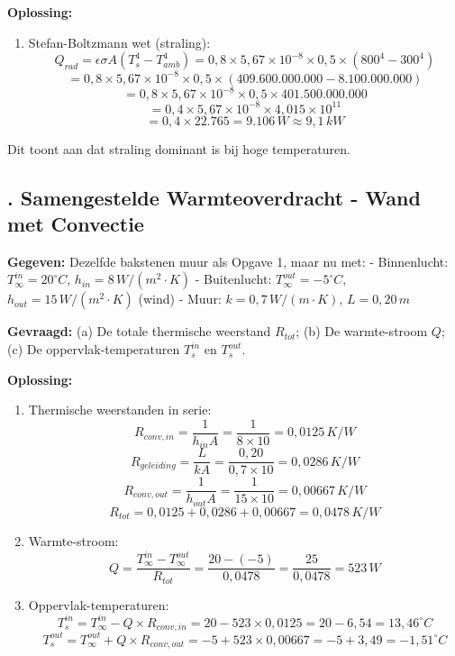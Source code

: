 \documentclass[a4paper,11pt,twoside]{report}
\newcounter{opgave}[section]
\newcommand{\opgave}[1]{%
    \refstepcounter{opgave}%
    \subsection*{\textbf{\arabic{opgave}.} #1}%
}
\begin{document}
\textbf{Oplossing:}
\begin{enumerate}
    \item Stefan-Boltzmann wet (straling):
    \[ Q_{rad} = \epsilon \sigma A (T_s^4 - T_{amb}^4) = 0,8 \times 5,67 \times 10^{-8} \times 0,5 \times (800^4 - 300^4) \]
    \[ = 0,8 \times 5,67 \times 10^{-8} \times 0,5 \times (409.600.000.000 - 8.100.000.000) \]
    \[ = 0,8 \times 5,67 \times 10^{-8} \times 0,5 \times 401.500.000.000 \]
    \[ = 0,4 \times 5,67 \times 10^{-8} \times 4,015 \times 10^{11} \]
    \[ = 0,4 \times 22.765 = 9.106 \, W \approx 9,1 \, kW \]
\end{enumerate}

Dit toont aan dat straling dominant is bij hoge temperaturen.

\opgave{Samengestelde Warmteoverdracht - Wand met Convectie}
\textbf{Gegeven:}
Dezelfde bakstenen muur als Opgave 1, maar nu met:
- Binnenlucht: $T_\infty^{in} = 20^\circ C$, $h_{in} = 8 \, W/(m^2 \cdot K)$
- Buitenlucht: $T_\infty^{out} = -5^\circ C$, $h_{out} = 15 \, W/(m^2 \cdot K)$ (wind)
- Muur: $k = 0,7 \, W/(m \cdot K)$, $L = 0,20 \, m$

\textbf{Gevraagd:}
(a) De totale thermische weerstand $R_{tot}$; (b) De warmte-stroom $Q$; (c) De oppervlak-temperaturen $T_s^{in}$ en $T_s^{out}$.

\textbf{Oplossing:}
\begin{enumerate}
    \item Thermische weerstanden in serie:
    \[ R_{conv,in} = \frac{1}{h_{in} A} = \frac{1}{8 \times 10} = 0,0125 \, K/W \]
    \[ R_{geleiding} = \frac{L}{k A} = \frac{0,20}{0,7 \times 10} = 0,0286 \, K/W \]
    \[ R_{conv,out} = \frac{1}{h_{out} A} = \frac{1}{15 \times 10} = 0,00667 \, K/W \]
    \[ R_{tot} = 0,0125 + 0,0286 + 0,00667 = 0,0478 \, K/W \]
    
    \item Warmte-stroom:
    \[ Q = \frac{T_\infty^{in} - T_\infty^{out}}{R_{tot}} = \frac{20 - (-5)}{0,0478} = \frac{25}{0,0478} = 523 \, W \]
    
    \item Oppervlak-temperaturen:
    \[ T_s^{in} = T_\infty^{in} - Q \times R_{conv,in} = 20 - 523 \times 0,0125 = 20 - 6,54 = 13,46^\circ C \]
    \[ T_s^{out} = T_\infty^{out} + Q \times R_{conv,out} = -5 + 523 \times 0,00667 = -5 + 3,49 = -1,51^\circ C \]
\end{enumerate}
\end{document}
